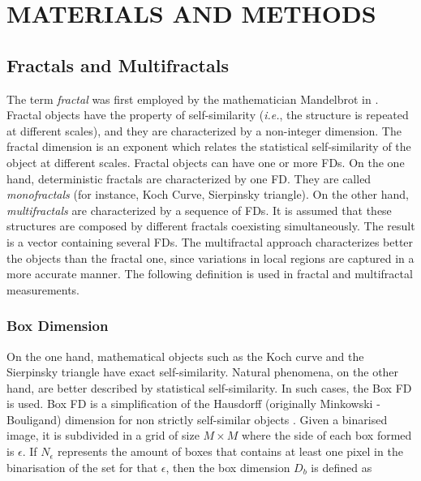 \documentclass[a4paper,10pt]{article}
\begin{document}



\section{MATERIALS AND METHODS}
\subsection{Fractals and Multifractals}

The term {\em fractal} was first employed by the mathematician Mandelbrot in \cite{Mandelbrot83}. Fractal objects have the property of self-similarity ({\em i.e.}, the structure is repeated at different scales), and they are characterized by a non-integer dimension. The fractal dimension is an exponent which relates the statistical self-similarity of the object at different scales. Fractal objects can have one or more FDs. On the one hand, deterministic fractals are characterized by one FD. They are called {\em monofractals} (for instance, Koch Curve, Sierpinsky triangle). On the other hand, {\em multifractals} \cite{Mandelbrot89} are characterized by a sequence of FDs. It is assumed that these structures are composed by different fractals coexisting simultaneously. The result is a vector containing several FDs. The multifractal approach characterizes better the objects than the fractal one, since variations in local regions are captured in a more accurate manner. The following definition is used in fractal and multifractal measurements.

\subsubsection{Box Dimension}
On the one hand, mathematical objects such as the Koch curve and the Sierpinsky triangle have exact self-similarity. Natural phenomena, on the other hand, are better described by statistical self-similarity. In such cases, the Box FD is used. Box FD is a simplification of the Hausdorff (originally Minkowski - Bouligand) dimension for non strictly self-similar objects \cite{Peitgen2004}. Given a binarised image, it is subdivided in a grid of size $M\times M$ where the side of each box formed is $\epsilon$. If $N_{\epsilon}$ represents the amount of boxes that contains at least one pixel in the binarisation of the set for that $\epsilon$, then the box dimension  $D_{b}$ is defined as
\end{document}
